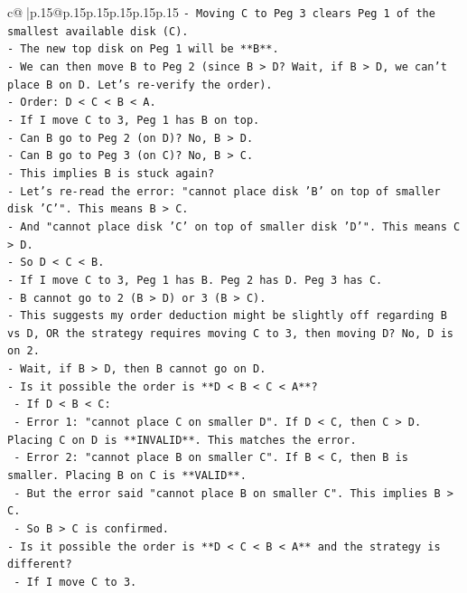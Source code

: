 \documentclass{article}
\begin{document}
{\begin{supertabular}{c@{$\;$}|p{.15\linewidth}@{}p{.15\linewidth}p{.15\linewidth}p{.15\linewidth}p{.15\linewidth}p{.15\linewidth}}
{{{\texttt{{-} Moving C to Peg 3 clears Peg 1 of the smallest available disk (C).} \\
\texttt{{-} The new top disk on Peg 1 will be **B**.} \\
\texttt{{-} We can then move B to Peg 2 (since B > D? Wait, if B > D, we can't place B on D. Let's re{-}verify the order).} \\
\texttt{{-} Order: D < C < B < A.} \\
\texttt{{-} If I move C to 3, Peg 1 has B on top.} \\
\texttt{{-} Can B go to Peg 2 (on D)? No, B > D.} \\
\texttt{{-} Can B go to Peg 3 (on C)? No, B > C.} \\
\texttt{{-} This implies B is stuck again?} \\
\texttt{{-} Let's re{-}read the error: "cannot place disk 'B' on top of smaller disk 'C'". This means B > C.} \\
\texttt{{-} And "cannot place disk 'C' on top of smaller disk 'D'". This means C > D.} \\
\texttt{{-} So D < C < B.} \\
\texttt{{-} If I move C to 3, Peg 1 has B. Peg 2 has D. Peg 3 has C.} \\
\texttt{{-} B cannot go to 2 (B > D) or 3 (B > C).} \\
\texttt{{-} This suggests my order deduction might be slightly off regarding B vs D, OR the strategy requires moving C to 3, then moving D? No, D is on 2.} \\
\texttt{{-} Wait, if B > D, then B cannot go on D.} \\
\texttt{{-} Is it possible the order is **D < B < C < A**?} \\
\texttt{    {-} If D < B < C:} \\
\texttt{        {-} Error 1: "cannot place C on smaller D". If D < C, then C > D. Placing C on D is **INVALID**. This matches the error.} \\
\texttt{        {-} Error 2: "cannot place B on smaller C". If B < C, then B is smaller. Placing B on C is **VALID**.} \\
\texttt{        {-} But the error said "cannot place B on smaller C". This implies B > C.} \\
\texttt{    {-} So B > C is confirmed.} \\
\texttt{{-} Is it possible the order is **D < C < B < A** and the strategy is different?} \\
\texttt{    {-} If I move C to 3.} \\
}}}
\end{supertabular}}
\end{document}
